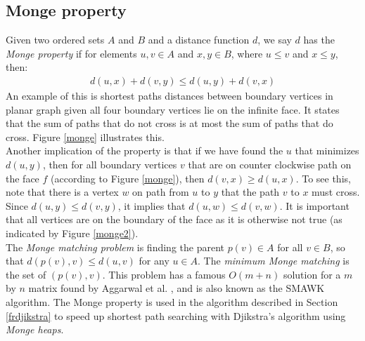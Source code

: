 \subsection{Monge property}
Given two ordered sets $A$ and $B$ and a distance function $d$, we say $d$ has the
\textit{Monge property} if for elements $u, v\in A$ and $x, y\in B$, where
$u\leq v$ and $x\leq y$, then:
\begin{align*}
  d(u,x)+d(v,y)\leq d(u, y)+d(v,x)
\end{align*}
An example of this is shortest paths distances between boundary vertices in planar graph
given all four boundary vertices lie on the infinite face. It states that the sum of
paths that do not cross is at most the sum of paths that do cross. Figure \ref{monge}
illustrates this. \\
Another implication of the property is that if we have found the $u$ that minimizes $d(u,y)$,
then for all boundary vertices $v$ that are on  counter clockwise path on the face $f$
(according to Figure \ref{monge}), then $d(v,x)\geq d(u,x)$. To see this, note that there
is a vertex $w$ on path from $u$ to $y$ that the path $v$ to $x$ must cross. Since
$d(u,y)\leq d(v,y)$, it implies that $d(u,w)\leq d(v,w)$. It is important that all
vertices are on the boundary of the face as it is otherwise not true (as indicated by
Figure \ref{monge2}). \\
The \textit{Monge matching problem} is finding the parent $p(v)\in A$ for all $v\in B$,
so that $d(p(v), v)\leq d(u,v)$ for any $u\in A$. The \textit{minimum Monge matching} is
the set of $(p(v), v)$. This problem has a famous $O(m+n)$ solution for a $m$ by $n$ matrix found by Aggarwal et al.
\cite{aggarwal1987geometric}, and is also known as the SMAWK algorithm. The Monge property is used in the algorithm described in Section
\ref{frdjikstra} to speed up shortest path searching with Djikstra's algorithm using
\textit{Monge heaps}.

